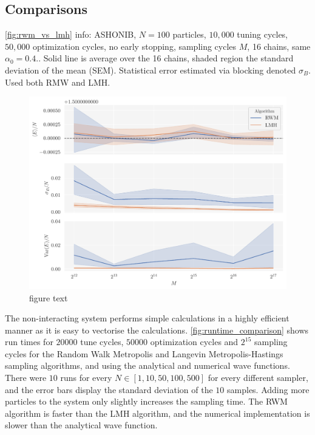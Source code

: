 \FloatBarrier

\subsection{Comparisons}

\autoref{fig:rwm_vs_lmh} info: ASHONIB, $N=100$ particles, $10,000$ tuning cycles, $50,000$ optimization cycles, no early stopping, sampling cycles $M$, 16 chains, same $\alpha_0 = 0.4.$. Solid line is average over the 16 chains, shaded region the standard deviation of the mean (SEM). Statistical error estimated via blocking denoted $\sigma_B$. Used both RMW and LMH.

\begin{figure}[!htb]
\begin{center}\includegraphics[width=\textwidth]{latex/figures/ashonib_N100_rwm_vs_lmh.pdf}
\end{center}
\caption{figure text}
\label{fig:rwm_vs_lmh}
\end{figure}



The non-interacting system performs simple calculations in a highly efficient manner as it is easy to vectorise the calculations. \autoref{fig:runtime_comparison} shows run times for $20000$ tune cycles, $50000$ optimization cycles and $2^{15}$ sampling cycles for the Random Walk Metropolis and Langevin Metropolis-Hastings sampling algorithms, and using the analytical and numerical wave functions. There were $10$ runs for every $N\in[1, 10, 50, 100, 500]$ for every different sampler, and the error bars display the standard deviation of the $10$ samples. Adding more particles to the system only slightly increases the sampling time. The RWM algorithm is faster than the LMH algorithm, and the numerical implementation is slower than the analytical wave function. 

